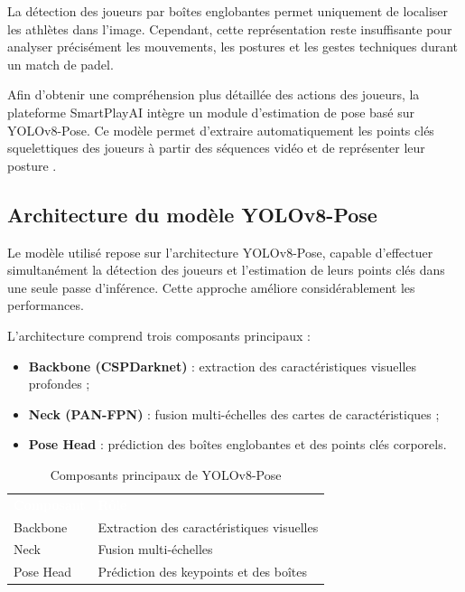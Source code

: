 La détection des joueurs par boîtes englobantes permet uniquement de localiser les athlètes dans l’image. Cependant, cette représentation reste insuffisante pour analyser précisément les mouvements, les postures et les gestes techniques durant un match de padel.

Afin d’obtenir une compréhension plus détaillée des actions des joueurs, la plateforme SmartPlayAI intègre un module d’estimation de pose basé sur YOLOv8-Pose. Ce modèle permet d’extraire automatiquement les points clés squelettiques des joueurs à partir des séquences vidéo et de représenter leur posture  .

\subsection{Architecture du modèle YOLOv8-Pose}

Le modèle utilisé repose sur l’architecture YOLOv8-Pose, capable d’effectuer simultanément la détection des joueurs et l’estimation de leurs points clés dans une seule passe d’inférence. Cette approche améliore considérablement les performances.

L’architecture comprend trois composants principaux :

\begin{itemize}
    \item \textbf{Backbone (CSPDarknet)} : extraction des caractéristiques visuelles profondes ;
    \item \textbf{Neck (PAN-FPN)} : fusion multi-échelles des cartes de caractéristiques ;
    \item \textbf{Pose Head} : prédiction des boîtes englobantes et des points clés corporels.
\end{itemize}

\begin{table}[H]
  \centering
  \renewcommand{\arraystretch}{1.3}
  \begin{tabularx}{\textwidth}{C{4cm} X}
    \textcolor{white}{\textbf{Composant}} &
    \textcolor{white}{\textbf{Rôle}} \\
    Backbone & Extraction des caractéristiques visuelles \\
    Neck & Fusion multi-échelles \\
    Pose Head & Prédiction des keypoints et des boîtes \\
  \end{tabularx}
  \caption{Composants principaux de YOLOv8-Pose}
  \label{tab:composants_yolopose}
\end{table}

